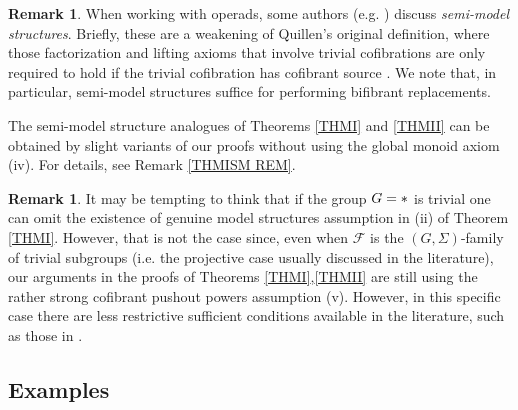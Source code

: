 \documentclass[a4paper,10pt
,draft
]{article}%
\numberwithin{equation}{section}
\numberwithin{figure}{section}
\theoremstyle{definition} %
\newtheorem{remark}[equation]{Remark}%
\newcommand{\Cat}{\mathsf{Cat}}
\newcommand{\F}{\ensuremath{\mathcal F}}
\newcommand{\V}{\ensuremath{\mathcal V}}
\newcommand{\1}{\ensuremath{\mathbbm 1}}%
\begin{document}
\begin{remark}\label{SEMI_REM}
	When working with operads, some authors (e.g. \cite{Spi,Whi17,WY18})
	discuss \emph{semi-model structures}.
	Briefly, these are a weakening of Quillen's original definition,
	where those factorization and lifting axioms
	that involve trivial cofibrations
	are only required to hold if the trivial cofibration 
	has cofibrant source \cite[\S 2.2]{WY18}.
	We note that, in particular, semi-model structures suffice for 
	performing %
	bifibrant replacements.
        
	The semi-model structure analogues of 
	Theorems \ref{THMI} and \ref{THMII}
	can be obtained by slight variants of our proofs
	without using the global monoid axiom (iv).
	For details, see Remark \ref{THMISM REM}.
\end{remark}



\begin{remark}\label{GTRIV REM}
	It may be tempting to think that if the group $G=\**$ is trivial
	one can omit the existence of genuine model structures assumption in (ii) of Theorem \ref{THMI}.
	However, that is not the case since, 
	even when $\F$ is the $(G,\Sigma)$-family of trivial subgroups
	(i.e. the projective case usually discussed in the literature),
	our arguments in the proofs of Theorems \ref{THMI},\ref{THMII}
	are still using the rather strong
	cofibrant pushout powers assumption (v).
	However, in this specific case 
	there are less restrictive sufficient conditions available in the literature, such as those in \cite[Thm. 1.1]{PS18}.
%
 \end{remark}





\subsection{Examples}\label{EXAMPLES SEC}
\end{document}

